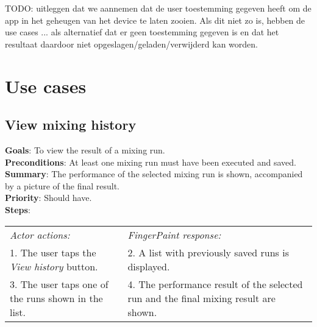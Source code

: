 \begin{appendices}

TODO: uitleggen dat we aannemen dat de user toestemming gegeven heeft om de app in het geheugen van het device te laten zooien. Als dit niet zo is, hebben de use cases ... als alternatief dat er geen toestemming gegeven is en dat het resultaat daardoor niet opgeslagen/geladen/verwijderd kan worden.

\chapter{Use cases}
\section{View mixing history}
  \label{mixhist}
  \textbf{Goals}: To view the result of a mixing run.\\
  \textbf{Preconditions}: At least one mixing run must have been executed and saved.\\
  \textbf{Summary}: The performance of the selected mixing run is shown, accompanied by a picture of the final result.\\
  \textbf{Priority}: Should have.\\
  \textbf{Steps}: \\
    \begin{tabular}{ p{} p{} }
  	\emph{Actor actions:} & \emph{FingerPaint response:} \\
    1. The user taps the \emph{View history} button. & 2. A list with previously saved runs is displayed. \\
    3. The user taps one of the runs shown in the list. & 4. The performance result of the selected run and the final mixing result are shown. \\
    \end{tabular}


\end{appendices}
